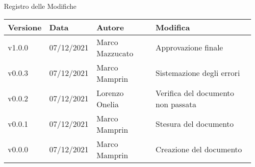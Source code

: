 \begin{center}
    \huge{Registro delle Modifiche}
  \end{center}

  \begin{center}
    \begin{tabular}{|p{2cm}|p{2cm}|p{4cm}|p{5cm}|}
      \hline
      \textbf{Versione} & \textbf{Data} & \textbf{Autore} & \textbf{Modifica}                    \\ \hline
      v1.0.0            & 07/12/2021    & Marco Mazzucato    & Approvazione finale \\ \hline
      v0.0.3            & 07/12/2021    & Marco Mamprin   & Sistemazione degli errori \\ \hline
      v0.0.2            & 07/12/2021    & Lorenzo Onelia  & Verifica del documento non passata \\ \hline
      v0.0.1            & 07/12/2021    & Marco Mamprin   & Stesura del documento \\ \hline
      v0.0.0            & 07/12/2021    & Marco Mamprin   & Creazione del documento \\ \hline
    \end{tabular}
  \end{center}
